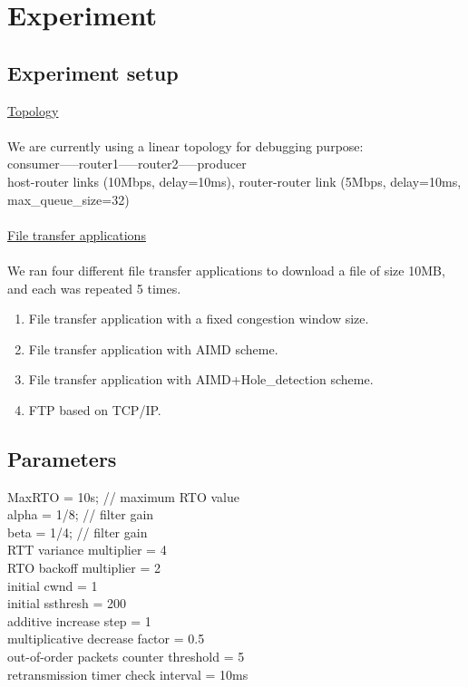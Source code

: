 \documentclass[10pt]{article}
\begin{document}
\section{Experiment}

\subsection{Experiment setup}

\underline{Topology}\\\\
We are currently using a linear topology for debugging purpose:\\
consumer-----router1-----router2-----producer\\
host-router links (10Mbps, delay=10ms),  router-router link (5Mbps,
delay=10ms, max\_queue\_size=32)\\\\

\underline{File transfer applications}\\\\
We ran four different file transfer applications to download a file of
size 10MB, and each was repeated 5 times.
\begin{enumerate}
\item File transfer application with a fixed congestion window size.
\item File transfer application with AIMD scheme.
\item File transfer application with AIMD+Hole\_detection scheme.
\item FTP based on TCP/IP.
\end{enumerate}

\subsection{Parameters}
\begin{mdframed}
  MaxRTO = 10s; // maximum RTO value\\
  alpha = 1/8; // filter gain\\
  beta = 1/4; // filter gain\\
  RTT variance multiplier = 4\\
  RTO backoff multiplier = 2\\
  initial cwnd = 1\\
  initial ssthresh = 200\\
  additive increase step = 1\\
  multiplicative decrease factor = 0.5\\
  out-of-order packets counter threshold = 5\\
  retransmission timer check interval = 10ms
\end{mdframed}
\end{document}
